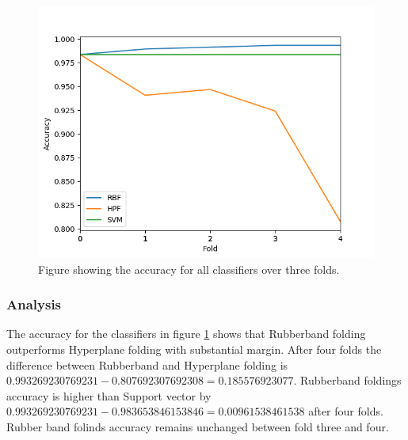 \documentclass[a4paper,twoside]{bth}
\begin{document}
\begin{figure}[!htb]
\centering
\includegraphics[scale=0.7]{images/result-bmi/Accuracy.png}
   \caption{Figure showing the accuracy for all classifiers over three folds.}
   \label{fig:bmi-accuracy}
\end{figure}

\FloatBarrier

\subsubsection{Analysis}
The accuracy for the classifiers in figure \ref{fig:bmi-accuracy} shows that Rubberband folding outperforms Hyperplane folding with substantial margin. After four folds the difference between Rubberband and Hyperplane folding is $0.993269230769231 - 0.807692307692308 = 0.185576923077$. Rubberband foldings accuracy is higher than Support vector by $0.993269230769231 - 0.983653846153846 = 0.00961538461538$ after four folds. Rubber band folinds accuracy remains unchanged between fold three and four. 

\clearpage
\FloatBarrier
\end{document}
